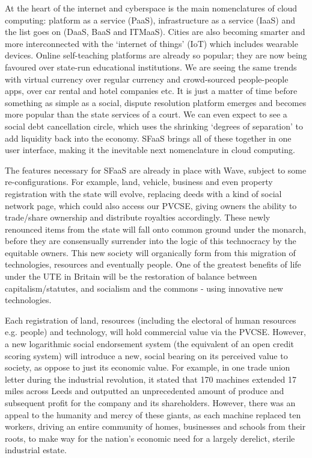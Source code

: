 \documentclass[letterpaper,10pt,openany,oneside,english]{sphinxmanual}
\begin{document}
At the heart of the internet and cyberspace is the main nomenclatures of cloud computing: platform as a service (PaaS), infrastructure as a service (IaaS) and the list goes on (DaaS, BaaS and ITMaaS). Cities are also becoming smarter and more interconnected with the ‘internet of things’ (IoT) which includes wearable devices. Online self-teaching platforms are already so popular; they are now being favoured over state-run educational institutions. We are seeing the same trends with virtual currency over regular currency and crowd-sourced people-people apps, over car rental and hotel companies etc. It is just a matter of time before something as simple as a social, dispute resolution platform emerges and becomes more popular than the state services of a court. We can even expect to see a social debt cancellation circle, which uses the shrinking ‘degrees of separation’ to add liquidity back into the economy. SFaaS brings all of these together in one user interface, making it the inevitable next nomenclature in cloud computing.

The features necessary for SFaaS are already in place with Wave, subject to some re-configurations. For example, land, vehicle, business and even property registration with the state will evolve, replacing deeds with a kind of social network page, which could also access our PVCSE, giving owners the ability to trade/share ownership and distribute royalties accordingly. These newly renounced items from the state will fall onto common ground under the monarch, before they are consensually surrender into the logic of this technocracy by the equitable owners. This new society will organically form from this migration of technologies, resources and eventually people. One of the greatest benefits of life under the UTE in Britain will be the restoration of balance between capitalism/statutes, and socialism and the commons - using innovative new technologies.

Each registration of land, resources (including the electoral of human resources e.g. people) and technology, will hold commercial value via the PVCSE. However, a new logarithmic social endorsement system (the equivalent of an open credit scoring system) will introduce a new, social bearing on its perceived value to society, as oppose to just its economic value. For example, in one trade union letter during the industrial revolution, it stated that 170 machines extended 17 miles across Leeds and outputted an unprecedented amount of produce and subsequent profit for the company and its shareholders. However, there was an appeal to the humanity and mercy of these giants, as each machine replaced ten workers, driving an entire community of homes, businesses and schools from their roots, to make way for the nation’s economic need for a largely derelict, sterile industrial estate.
\end{document}
